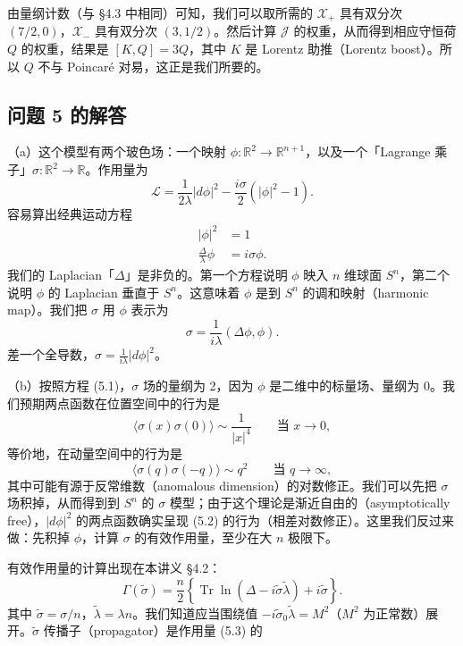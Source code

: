 由量纲计数（与 §4.3 中相同）可知，我们可以取所需的 $\mathscr{X}_+$ 具有双分次 $(7/2,0)$，$\mathscr{X}_-$ 具有双分次 $(3,1/2)$。然后计算 $\mathcal{J}$ 的权重，从而得到相应守恒荷 $Q$ 的权重，结果是 $[K,Q]=3Q$，其中 $K$ 是 Lorentz 助推（Lorentz boost）。所以 $Q$ 不与 Poincaré 对易，这正是我们所要的。

\subsection*{问题 5 的解答}

（a）这个模型有两个玻色场：一个映射 $\phi\colon\mathbb{R}^2\to\mathbb{R}^{n+1}$，以及一个「Lagrange 乘子」$\sigma\colon\mathbb{R}^2\to\mathbb{R}$。作用量为
\[
\mathcal{L}=\frac{1}{2\lambda}|d\phi|^2-\frac{i\sigma}{2}(|\phi|^2-1).
\]
容易算出经典运动方程
\[
\begin{aligned}
|\phi|^2&=1\\
\frac{\Delta}{\lambda}\phi&=i\sigma\phi .
\end{aligned}
\]
我们的 Laplacian「$\Delta$」是非负的。第一个方程说明 $\phi$ 映入 $n$ 维球面 $S^n$，第二个说明 $\phi$ 的 Laplacian 垂直于 $S^n$。这意味着 $\phi$ 是到 $S^n$ 的调和映射（harmonic map）。我们把 $\sigma$ 用 $\phi$ 表示为
\begin{equation}
  \sigma=\frac{1}{i\lambda}(\Delta\phi,\phi).
  \tag{5.1}
  \label{eq:sol5-1}
\end{equation}
差一个全导数，$\sigma=\frac{1}{i\lambda}|d\phi|^2$。

（b）按照方程 (5.1)，$\sigma$ 场的量纲为 2，因为 $\phi$ 是二维中的标量场、量纲为 0。我们预期两点函数在位置空间中的行为是
\[
\langle\sigma(x)\sigma(0)\rangle\sim\frac{1}{|x|^4}\qquad\text{当 }x\to0,
\]
等价地，在动量空间中的行为是
\begin{equation}
  \langle\sigma(q)\sigma(-q)\rangle\sim q^2\qquad\text{当 }q\to\infty,
  \tag{5.2}
  \label{eq:sol5-2}
\end{equation}
其中可能有源于反常维数（anomalous dimension）的对数修正。我们可以先把 $\sigma$ 场积掉，从而得到到 $S^n$ 的 $\sigma$ 模型；由于这个理论是渐近自由的（asymptotically free），$|d\phi|^2$ 的两点函数确实呈现 (5.2) 的行为（相差对数修正）。这里我们反过来做：先积掉 $\phi$，计算 $\sigma$ 的有效作用量，至少在大 $n$ 极限下。

有效作用量的计算出现在本讲义 §4.2：
\begin{equation}
  \Gamma(\tilde\sigma)=\frac{n}{2}\left\{\operatorname{Tr}\ln(\Delta-i\tilde\sigma\tilde\lambda)+i\tilde\sigma\right\}.
  \tag{5.3}
  \label{eq:sol5-3}
\end{equation}
其中 $\tilde\sigma=\sigma/n$，$\tilde\lambda=\lambda n$。我们知道应当围绕值 $-i\tilde\sigma_0\tilde\lambda=M^2$（$M^2$ 为正常数）展开。$\tilde\sigma$ 传播子（propagator）是作用量 (5.3) 的

